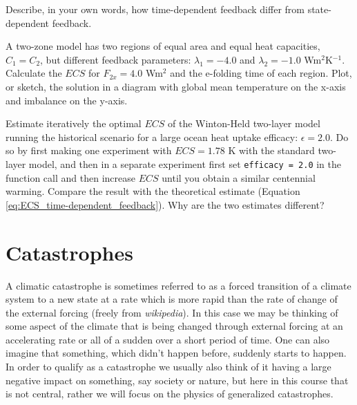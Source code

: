 \documentclass[12pt]{book}
\begin{document}



\newpage
\vspace{1 cm}
{\setlength{\parindent}{0cm}

\begin{exercise}
Describe, in your own words, how time-dependent feedback differ from state-dependent feedback. 
\end{exercise}

\begin{exercise}
A two-zone model has two regions of equal area and equal heat capacities, $C_1=C_2$, but different feedback parameters: $\lambda_1=-4.0$ and $\lambda_2=-1.0$ Wm$^{2}$K$^{-1}$. Calculate the $ECS$ for $F_{2x}=4.0$ Wm$^{2}$ and the e-folding time of each region. Plot, or sketch, the solution in a diagram with global mean temperature on the x-axis and imbalance on the y-axis.
\end{exercise}

\begin{exercise}
Estimate iteratively the optimal $ECS$ of the Winton-Held two-layer model running the historical scenario for a large ocean heat uptake efficacy: $\epsilon=2.0$. Do so by first making one experiment with $ECS = 1.78$ K with the standard two-layer model, and then in a separate experiment first set \verb|efficacy = 2.0| in the function call and then increase $ECS$ until you obtain a similar centennial warming. Compare the result with the theoretical estimate (Equation \ref{eq:ECS_time-dependent_feedback}). Why are the two estimates different?
\end{exercise}

}


\chapter{Catastrophes}
\label{chapter:catastrophes}

A climatic catastrophe is sometimes referred to as a forced transition of a climate system to a new state at a rate which is more rapid than the rate of change of the external forcing (freely from {\em wikipedia}). In this case we may be thinking of some aspect of the climate that is being changed through external forcing at an accelerating rate or all of a sudden over a short period of time. One can also imagine that something, which didn't happen before, suddenly starts to happen. In order to qualify as a catastrophe we usually also think of it having a large negative impact on something, say society or nature, but here in this course that is not central, rather we will focus on the physics of generalized catastrophes.
\end{document}
